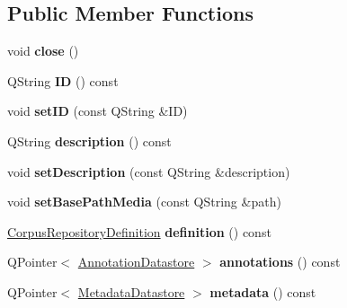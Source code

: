 \subsection*{Public Member Functions}
\begin{DoxyCompactItemize}
\item 
\mbox{\label{class_corpus_repository_a9b505f5f200100ea4f2d77f55e7fc845}} 
void {\bfseries close} ()
\item 
\mbox{\label{class_corpus_repository_ad2cc4235276a9255ba67685c97d5f051}} 
Q\+String {\bfseries ID} () const
\item 
\mbox{\label{class_corpus_repository_a4039cf6526092b775f517dd297d8027b}} 
void {\bfseries set\+ID} (const Q\+String \&ID)
\item 
\mbox{\label{class_corpus_repository_a145688e9ad7b25c86f9fc0d8cdd24be8}} 
Q\+String {\bfseries description} () const
\item 
\mbox{\label{class_corpus_repository_a6c38e725b348fc1b0ff3430c0f20147f}} 
void {\bfseries set\+Description} (const Q\+String \&description)
\item 
\mbox{\label{class_corpus_repository_ab0877cb895b6ce09361095cb34634556}} 
void {\bfseries set\+Base\+Path\+Media} (const Q\+String \&path)
\item 
\mbox{\label{class_corpus_repository_a048c24879c8a9737ea5e863446016f03}} 
\hyperlink{class_corpus_repository_definition}{Corpus\+Repository\+Definition} {\bfseries definition} () const
\item 
\mbox{\label{class_corpus_repository_a9a0a2c78a9bb86f4144d0a10ef6d3423}} 
Q\+Pointer$<$ \hyperlink{class_annotation_datastore}{Annotation\+Datastore} $>$ {\bfseries annotations} () const
\item 
\mbox{\label{class_corpus_repository_a58278c1281f30f1b7c94cacb21b9222a}} 
Q\+Pointer$<$ \hyperlink{class_metadata_datastore}{Metadata\+Datastore} $>$ {\bfseries metadata} () const

\end{DoxyCompactItemize}
